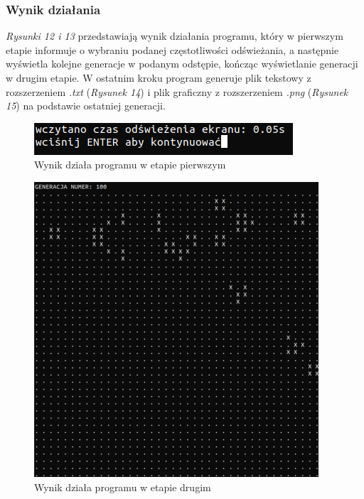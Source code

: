 \documentclass[11pt,a4paper]{report}
\begin{document}
\begin {itemize}
\subsubsection {Wynik działania}
\textsl{Rysunki 12 i 13} przedstawiają wynik działania programu, który w pierwszym etapie informuje o wybraniu podanej częstotliwości odświeżania, a następnie wyświetla kolejne generacje w podanym odstępie, kończąc wyświetlanie generacji w drugim etapie. W ostatnim kroku program generuje plik tekstowy z rozszerzeniem \textsl{.txt} (\textsl{Rysunek 14}) i plik graficzny z rozszerzeniem \textsl{.png} (\textsl{Rysunek 15}) na podstawie ostatniej generacji.
\begin{figure}[!ht]
\centerline{\includegraphics{img/output_gosperglidergun1.png}}
\caption{Wynik działa programu w etapie pierwszym}
\end{figure}
\begin{figure}[!ht]
\centerline{\includegraphics{img/output_gosperglidergun2.png}}
\caption{Wynik działa programu w etapie drugim}
\end{figure}
\begin{figure}[!hp]

\end{figure}
\end{itemize}
\end{document}
